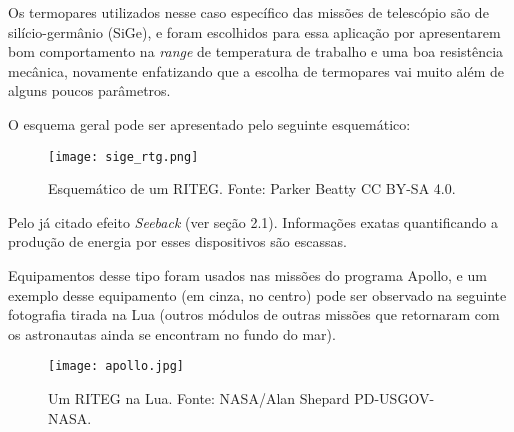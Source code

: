 \documentclass[a4paper,12pt]{report}
\begin{document}
	Os termopares utilizados nesse caso específico das missões de telescópio são de silício-germânio (SiGe), e foram escolhidos para essa aplicação por apresentarem bom comportamento na \textit{range} de temperatura de trabalho e uma boa resistência mecânica, novamente enfatizando que a escolha de termopares vai muito além de alguns poucos parâmetros.

	O esquema geral pode ser apresentado pelo seguinte esquemático:
	
	\begin{figure}[H]
		\centering
		\texttt{[image: sige\_rtg.png]}\\
		\caption{Esquemático de um RITEG. Fonte: Parker Beatty CC BY-SA 4.0.}
	\end{figure}
\newpage

	Pelo já citado efeito \textit{Seeback} (ver seção 2.1). Informações exatas quantificando a produção de energia por esses dispositivos são escassas.
	
	Equipamentos desse tipo foram usados nas missões do programa Apollo, e um exemplo desse equipamento (em cinza, no centro) pode ser observado na seguinte fotografia tirada na Lua (outros módulos de outras missões que retornaram com os astronautas ainda se encontram no fundo do mar).
	
		\begin{figure}[H]
		\centering
		\texttt{[image: apollo.jpg]}\\
		\caption{Um RITEG na Lua. Fonte: NASA/Alan Shepard PD-USGOV-NASA.}
	\end{figure}
	
\end{document}
